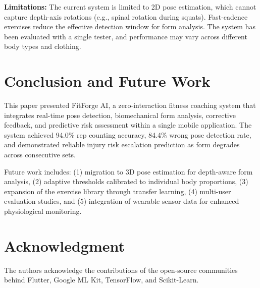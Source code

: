 \documentclass[conference]{IEEEtran}
\begin{document}
\textbf{Limitations:} The current system is limited to 2D pose estimation, which cannot capture depth-axis rotations (e.g., spinal rotation during squats). Fast-cadence exercises reduce the effective detection window for form analysis. The system has been evaluated with a single tester, and performance may vary across different body types and clothing.

\section{Conclusion and Future Work}

This paper presented FitForge AI, a zero-interaction fitness coaching system that integrates real-time pose detection, biomechanical form analysis, corrective feedback, and predictive risk assessment within a single mobile application. The system achieved 94.0\% rep counting accuracy, 84.4\% wrong pose detection rate, and demonstrated reliable injury risk escalation prediction as form degrades across consecutive sets.

Future work includes: (1) migration to 3D pose estimation for depth-aware form analysis, (2) adaptive thresholds calibrated to individual body proportions, (3) expansion of the exercise library through transfer learning, (4) multi-user evaluation studies, and (5) integration of wearable sensor data for enhanced physiological monitoring.

\section*{Acknowledgment}

The authors acknowledge the contributions of the open-source communities behind Flutter, Google ML Kit, TensorFlow, and Scikit-Learn.
\end{document}
